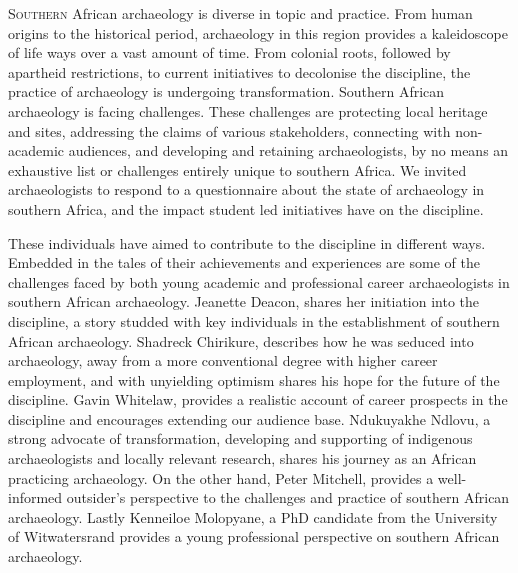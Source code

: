\documentclass[%
	]{ijsra}
\begin{document}
\IJSRAopening
\lettrine{S}{outhern} African archaeology is diverse in topic and practice. From human origins to the historical period, archaeology in this region provides a kaleidoscope of life ways over a vast amount of time. From colonial roots, followed by apartheid restrictions, to current initiatives to decolonise the discipline, the practice of archaeology is undergoing transformation. Southern African archaeology is facing challenges. These challenges are protecting local heritage and sites, addressing the claims of various stakeholders, connecting with non-academic audiences, and developing and retaining archaeologists, by no means an exhaustive list or challenges entirely unique to southern Africa. We invited archaeologists to respond to a questionnaire about the state of archaeology in southern Africa, and the impact student led initiatives have on the discipline. 

These individuals have aimed to contribute to the discipline in different ways. Embedded in the tales of their achievements and experiences are some of the challenges faced by both young academic and professional career archaeologists in southern African archaeology. Jeanette Deacon, shares her initiation into the discipline, a story studded with key individuals in the establishment of southern African archaeology. Shadreck Chirikure, describes how he was seduced into archaeology, away from a more conventional degree with higher career employment, and with unyielding optimism shares his hope for the future of the discipline. Gavin Whitelaw, provides a realistic account of career prospects in the discipline and encourages extending our audience base. Ndukuyakhe Ndlovu, a strong advocate of transformation, developing and supporting of indigenous archaeologists and locally relevant research, shares his journey as an African practicing archaeology. On the other hand, Peter Mitchell, provides a well-informed outsider’s perspective to the challenges and practice of southern African archaeology. Lastly Kenneiloe Molopyane, a PhD candidate from the University of Witwatersrand provides a young professional perspective on southern African archaeology.
\end{document}
